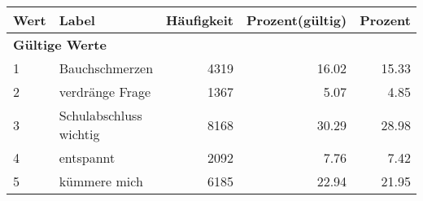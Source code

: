     \begin{longtable}{lXrrr}
     \toprule
     \textbf{Wert} & \textbf{Label} & \textbf{Häufigkeit} & \textbf{Prozent(gültig)} & \textbf{Prozent} \\
     \endhead
     \midrule
     \multicolumn{5}{l}{\textbf{Gültige Werte}}\\

     1 &
     \multicolumn{1}{X}{ Bauchschmerzen   } &


       \num{4319} &
       \num[round-mode=places,round-precision=2]{16.02} &
         \num[round-mode=places,round-precision=2]{15.33} \\

     2 &
     \multicolumn{1}{X}{ verdränge Frage   } &


       \num{1367} &
       \num[round-mode=places,round-precision=2]{5.07} &
         \num[round-mode=places,round-precision=2]{4.85} \\

     3 &
     \multicolumn{1}{X}{ Schulabschluss wichtig   } &


       \num{8168} &
       \num[round-mode=places,round-precision=2]{30.29} &
         \num[round-mode=places,round-precision=2]{28.98} \\

     4 &
     \multicolumn{1}{X}{ entspannt   } &


       \num{2092} &
       \num[round-mode=places,round-precision=2]{7.76} &
         \num[round-mode=places,round-precision=2]{7.42} \\

     5 &
     \multicolumn{1}{X}{ kümmere mich   } &


       \num{6185} &
       \num[round-mode=places,round-precision=2]{22.94} &
         \num[round-mode=places,round-precision=2]{21.95} \\


\end{longtable}
